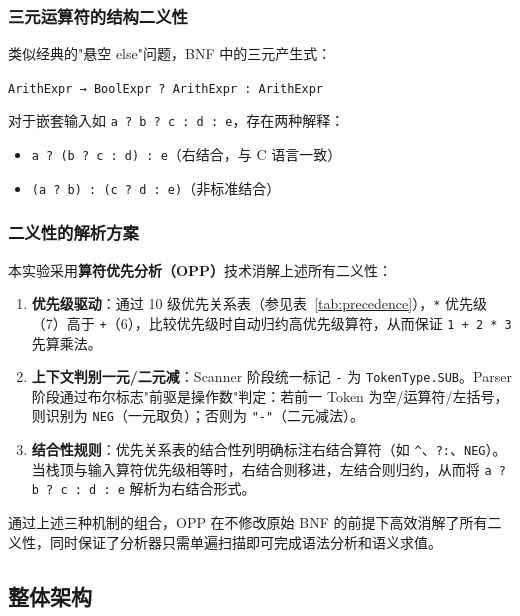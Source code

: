 \documentclass[a4paper]{article}
\begin{document}
\subsubsection{三元运算符的结构二义性}

类似经典的"悬空 else"问题，BNF 中的三元产生式：
\begin{center}
\texttt{ArithExpr → BoolExpr ? ArithExpr : ArithExpr}
\end{center}
对于嵌套输入如 \texttt{a ? b ? c : d : e}，存在两种解释：
\begin{itemize}
    \item \texttt{a ? (b ? c : d) : e}（右结合，与 C 语言一致）
    \item \texttt{(a ? b) : (c ? d : e)}（非标准结合）
\end{itemize}

\subsubsection{二义性的解析方案}

本实验采用\textbf{算符优先分析（OPP）}技术消解上述所有二义性：

\begin{enumerate}
    \item \textbf{优先级驱动}：通过 10 级优先关系表（参见表~\ref{tab:precedence}），\texttt{*} 优先级（7）高于 \texttt{+}（6），比较优先级时自动归约高优先级算符，从而保证 \texttt{1 + 2 * 3} 先算乘法。
    
    \item \textbf{上下文判别一元/二元减}：Scanner 阶段统一标记 \texttt{-} 为 \texttt{TokenType.SUB}。Parser 阶段通过布尔标志"前驱是操作数"判定：若前一 Token 为空/运算符/左括号，则识别为 \texttt{NEG}（一元取负）；否则为 \texttt{"-"}（二元减法）。
    
    \item \textbf{结合性规则}：优先关系表的结合性列明确标注右结合算符（如 \texttt{\^}、\texttt{?:}、\texttt{NEG}）。当栈顶与输入算符优先级相等时，右结合则移进，左结合则归约，从而将 \texttt{a ? b ? c : d : e} 解析为右结合形式。
\end{enumerate}

通过上述三种机制的组合，OPP 在不修改原始 BNF 的前提下高效消解了所有二义性，同时保证了分析器只需单遍扫描即可完成语法分析和语义求值。

\subsection{整体架构}
\end{document}
